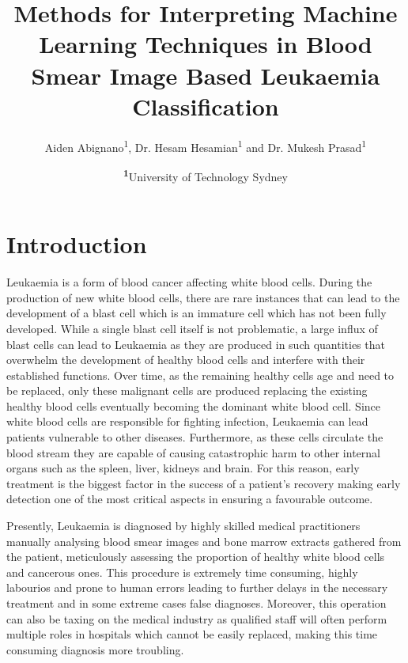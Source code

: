 \documentclass[
	a4paper,
	10pt,
	unnumberedsections,
	twoside,
]{research_article}
\title{Methods for Interpreting Machine Learning Techniques in Blood Smear Image Based Leukaemia Classification}
\author{Aiden Abignano\textsuperscript{1}, Dr. Hesam Hesamian\textsuperscript{1} and Dr. Mukesh Prasad\textsuperscript{1}}
\date{\footnotesize\textsuperscript{\textbf{1}}University of Technology Sydney}
\begin{document}
\maketitle %


\section{Introduction}

Leukaemia is a form of blood cancer affecting white blood cells. During the production of new white blood cells, there are rare instances that can lead to the development of a blast cell which is an immature cell which has not been fully developed. While a single blast cell itself is not problematic, a large influx of blast cells can lead to Leukaemia as they are produced in such quantities that overwhelm the development of healthy blood cells and interfere with their established functions. Over time, as the remaining healthy cells age and need to be replaced, only these malignant cells are produced replacing the existing healthy blood cells eventually becoming the dominant white blood cell. Since white blood cells are responsible for fighting infection, Leukaemia can lead patients vulnerable to other diseases. Furthermore, as these cells circulate the blood stream they are capable of causing catastrophic harm to other internal organs such as the spleen, liver, kidneys and brain. For this reason, early treatment is the biggest factor in the success of a patient's recovery making early detection one of the most critical aspects in ensuring a favourable outcome.

Presently, Leukaemia is diagnosed by highly skilled medical practitioners manually analysing blood smear images and bone marrow extracts gathered from the patient, meticulously assessing the proportion of healthy white blood cells and cancerous ones. This procedure is extremely time consuming, highly labourios and prone to human errors leading to further delays in the necessary treatment and in some extreme cases false diagnoses. Moreover, this operation can also be taxing on the medical industry as qualified staff will often perform multiple roles in hospitals which cannot be easily replaced, making this time consuming diagnosis more troubling.
\end{document}
